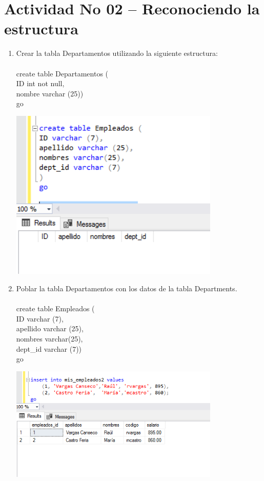\section{Actividad No 02 – Reconociendo la estructura} 

\begin{enumerate}[1.]
	\item Crear la tabla Departamentos utilizando la siguiente estructura:
	\\
           \\create table Departamentos (
		\\ID int not null,
		\\nombre varchar (25))
		\\go
	\begin{center}
	\includegraphics[width=10cm]{./Imagenes/prac2eje1} 
	\end{center}
	\item Poblar la tabla Departamentos con los datos de la tabla Departments.
	\\
		\\create table Empleados (
		\\ID varchar (7),
		\\apellido varchar (25),
		\\nombres varchar(25),
		\\dept\_id varchar (7))
		\\go
	\begin{center}
	\includegraphics[width=10cm]{./Imagenes/prac2eje2} 

\end{center}
\end{enumerate}
